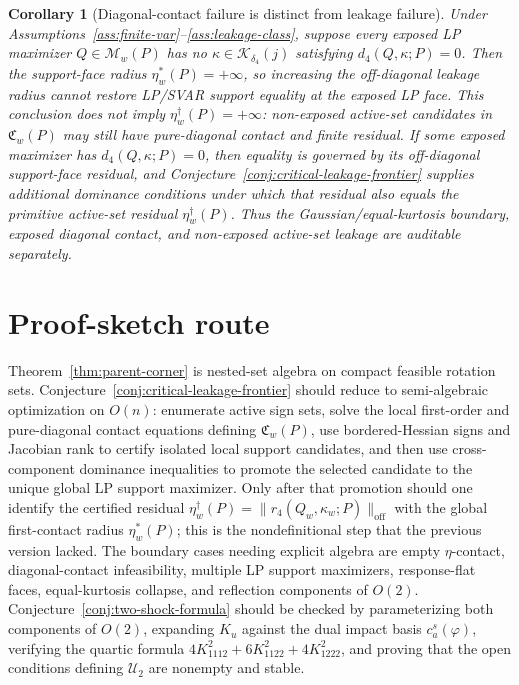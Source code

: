 \documentclass[11pt]{article}
\theoremstyle{definition}
\theoremstyle{plain}
\newtheorem{corollary}{Corollary}
\theoremstyle{remark}
\begin{document}
\begin{corollary}[Diagonal-contact failure is distinct from leakage failure]\label{cor:diagonal-contact}
Under Assumptions~\ref{ass:finite-var}--\ref{ass:leakage-class}, suppose every exposed LP maximizer \(Q\in\mathcal M_w(P)\) has no \(\kappa\in\mathcal K_{\delta_4}(j)\) satisfying \(d_4(Q,\kappa;P)=0\).  Then the support-face radius \(\eta_w^*(P)=+\infty\), so increasing the off-diagonal leakage radius cannot restore LP/SVAR support equality at the exposed LP face.  This conclusion does not imply \(\eta_w^\dagger(P)=+\infty\): non-exposed active-set candidates in \(\mathfrak C_w(P)\) may still have pure-diagonal contact and finite residual.  If some exposed maximizer has \(d_4(Q,\kappa;P)=0\), then equality is governed by its off-diagonal support-face residual, and Conjecture~\ref{conj:critical-leakage-frontier} supplies additional dominance conditions under which that residual also equals the primitive active-set residual \(\eta_w^\dagger(P)\).  Thus the Gaussian/equal-kurtosis boundary, exposed diagonal contact, and non-exposed active-set leakage are auditable separately.
\end{corollary}

\section{Proof-sketch route}
Theorem~\ref{thm:parent-corner} is nested-set algebra on compact feasible rotation sets.  Conjecture~\ref{conj:critical-leakage-frontier} should reduce to semi-algebraic optimization on \(O(n)\): enumerate active sign sets, solve the local first-order and pure-diagonal contact equations defining \(\mathfrak C_w(P)\), use bordered-Hessian signs and Jacobian rank to certify isolated local support candidates, and then use cross-component dominance inequalities to promote the selected candidate to the unique global LP support maximizer.  Only after that promotion should one identify the certified residual \(\eta_w^\dagger(P)=\|r_4(Q_w,\kappa_w;P)\|_{\mathrm{off}}\) with the global first-contact radius \(\eta_w^*(P)\); this is the nondefinitional step that the previous version lacked.  The boundary cases needing explicit algebra are empty \(\eta\)-contact, diagonal-contact infeasibility, multiple LP support maximizers, response-flat faces, equal-kurtosis collapse, and reflection components of \(O(2)\).  Conjecture~\ref{conj:two-shock-formula} should be checked by parameterizing both components of \(O(2)\), expanding \(K_u\) against the dual impact basis \(c_a^s(\varphi)\), verifying the quartic formula \(4K_{1112}^2+6K_{1122}^2+4K_{1222}^2\), and proving that the open conditions defining \(\mathcal U_2\) are nonempty and stable.
\end{document}
